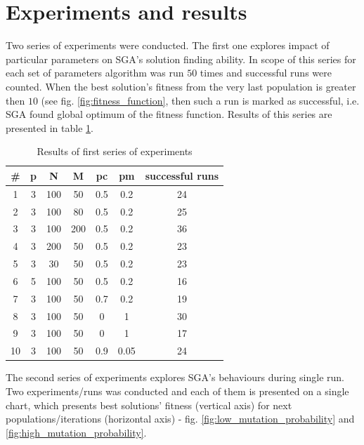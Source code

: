 \documentclass{classrep}
\begin{document}
    \section{Experiments and results} \label{results} {
        Two series of experiments were conducted. The first one explores impact of particular
        parameters on SGA's solution finding ability. In scope of this series for each set of
        parameters algorithm was run $50$ times and successful runs were counted. When the best
        solution's fitness from the very last population is greater then $10$ (see fig.
        \ref{fig:fitness_function}, then such a run is marked as successful, i.e. SGA found global
        optimum of the fitness function. Results of this series are presented in table
        \ref{tab:series_1_results}.

        \begin{table}[!htbp]
            \centering
            \caption{Results of first series of experiments}
            \begin{tabular}{|c|c|c|c|c|c|c|}
                \hline
                # & p & N & M & pc & pm & successful runs \\ \hline
                1 & 3 & 100 & 50 & 0.5 & 0.2 & 24 \\
                2 & 3 & 100 & 80 & 0.5 & 0.2 & 25 \\
                3 & 3 & 100 & 200 & 0.5 & 0.2 & 36 \\
                4 & 3 & 200 & 50 & 0.5 & 0.2 & 23 \\
                5 & 3 & 30 & 50 & 0.5 & 0.2 & 23 \\
                6 & 5 & 100 & 50 & 0.5 & 0.2 & 16 \\
                7 & 3 & 100 & 50 & 0.7 & 0.2 & 19 \\
                8 & 3 & 100 & 50 & 0 & 1 & 30 \\
                9 & 3 & 100 & 50 & 0 & 1 & 17 \\
                10 & 3 & 100 & 50 & 0.9 & 0.05 & 24 \\ \hline
            \end{tabular}
            \label{tab:series_1_results}
        \end{table}
        \FloatBarrier

        The second series of experiments explores SGA's behaviours during single run. Two
        experiments/runs was conducted and each of them is presented on a single chart, which
        presents best solutions' fitness (vertical axis) for next populations/iterations (horizontal
        axis) - fig. \ref{fig:low_mutation_probability} and \ref{fig:high_mutation_probability}.

}
\end{document}
